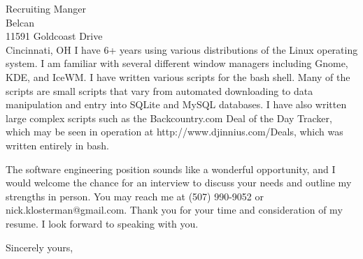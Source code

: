 \documentclass{letter} %
\begin{document}
\begin{letter}{Recruiting Manger \\
Belcan  \\
11591 Goldcoast Drive\\
Cincinnati, OH
}
\noindent 
I have 6+ years using various distributions of the Linux operating system. 
I am familiar with several different window managers including Gnome, KDE, and IceWM.
I have written various scripts for the bash shell.  
Many of the scripts are small scripts that vary from automated downloading to data manipulation and entry into SQLite and MySQL databases. 
I have also written large complex scripts such as the Backcountry.com Deal of the Day Tracker, which may be seen in operation at http://www.djinnius.com/Deals,  which was written entirely in bash.


 
\noindent 
The software engineering position sounds like a wonderful opportunity, and I would welcome the chance for an interview to discuss your needs and outline my strengths in person. 
You may reach me at (507) 990-9052 or nick.klosterman@gmail.com.
Thank you for your time and consideration of my resume. I look forward to speaking with you.
 

\closing{Sincerely yours,} 
 

 

\end{letter}
 
\end{document}
